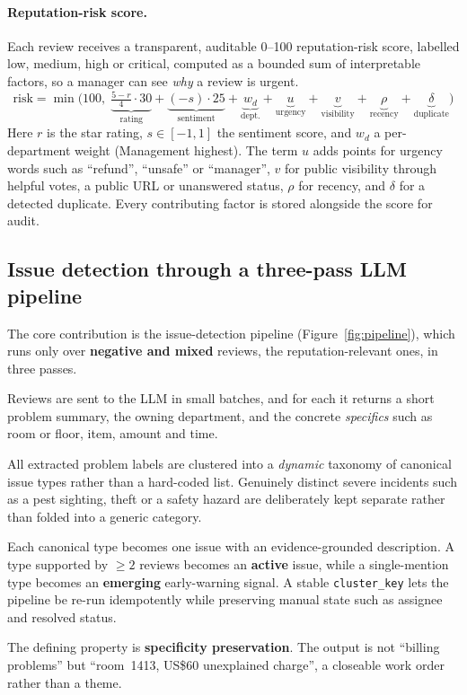\documentclass[11pt,a4paper]{article}
\begin{document}
\paragraph{Reputation-risk score.} Each review receives a transparent, auditable 0--100 reputation-risk
score, labelled low, medium, high or critical, computed as a bounded sum of interpretable factors, so a
manager can see \emph{why} a review is urgent.
\begin{equation}
\text{risk} = \min\!\Big(100,\;
\underbrace{\tfrac{5-r}{4}\cdot 30}_{\text{rating}}
+ \underbrace{(-s)\cdot 25}_{\text{sentiment}}
+ \underbrace{w_d}_{\text{dept.}}
+ \underbrace{u}_{\text{urgency}}
+ \underbrace{v}_{\text{visibility}}
+ \underbrace{\rho}_{\text{recency}}
+ \underbrace{\delta}_{\text{duplicate}}\Big)
\label{eq:risk}
\end{equation}
Here $r$ is the star rating, $s\in[-1,1]$ the sentiment score, and $w_d$ a per-department weight
(Management highest). The term $u$ adds points for urgency words such as ``refund'', ``unsafe'' or
``manager'', $v$ for public visibility through helpful votes, a public URL or unanswered status, $\rho$
for recency, and $\delta$ for a detected duplicate. Every contributing factor is stored alongside the
score for audit.

\subsection{Issue detection through a three-pass LLM pipeline}
The core contribution is the issue-detection pipeline (Figure~\ref{fig:pipeline}), which runs only over
\textbf{negative and mixed} reviews, the reputation-relevant ones, in three passes.
\begin{description}[leftmargin=1.4em,style=nextline]
  \item[Pass A, Extract.] Reviews are sent to the LLM in small batches, and for each it returns a short
  problem summary, the owning department, and the concrete \emph{specifics} such as room or floor, item,
  amount and time.
  \item[Pass B, Consolidate.] All extracted problem labels are clustered into a \emph{dynamic} taxonomy
  of canonical issue types rather than a hard-coded list. Genuinely distinct severe incidents such as a
  pest sighting, theft or a safety hazard are deliberately kept separate rather than folded into a
  generic category.
  \item[Pass C, Assemble.] Each canonical type becomes one issue with an evidence-grounded description.
  A type supported by $\geq 2$ reviews becomes an \textbf{active} issue, while a single-mention type
  becomes an \textbf{emerging} early-warning signal. A stable \texttt{cluster\_key} lets the pipeline be
  re-run idempotently while preserving manual state such as assignee and resolved status.
\end{description}
The defining property is \textbf{specificity preservation}. The output is not ``billing problems'' but
``room~1413, US\$60 unexplained charge'', a closeable work order rather than a theme.
\end{document}
